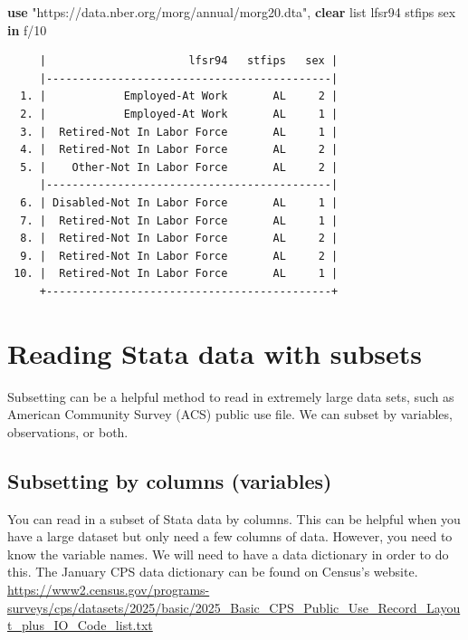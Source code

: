\documentclass[
]{book}
\newenvironment{Shaded}{\begin{snugshade}}{\end{snugshade}}
\newcommand{\KeywordTok}[1]{\textcolor[rgb]{0.13,0.29,0.53}{\textbf{#1}}}
\newcommand{\NormalTok}[1]{#1}
\newcommand{\OtherTok}[1]{\textcolor[rgb]{0.56,0.35,0.01}{#1}}
\newcommand{\StringTok}[1]{\textcolor[rgb]{0.31,0.60,0.02}{#1}}
\begin{document}
\begin{Shaded}
\begin{Highlighting}[]
\KeywordTok{use} \StringTok{"https://data.nber.org/morg/annual/morg20.dta"}\NormalTok{, }\KeywordTok{clear}
\OtherTok{list}\NormalTok{ lfsr94 stfips sex }\KeywordTok{in}\NormalTok{ f/10}
\end{Highlighting}
\end{Shaded}

\begin{verbatim}
     |                      lfsr94   stfips   sex |
     |--------------------------------------------|
  1. |            Employed-At Work       AL     2 |
  2. |            Employed-At Work       AL     1 |
  3. |  Retired-Not In Labor Force       AL     1 |
  4. |  Retired-Not In Labor Force       AL     2 |
  5. |    Other-Not In Labor Force       AL     2 |
     |--------------------------------------------|
  6. | Disabled-Not In Labor Force       AL     1 |
  7. |  Retired-Not In Labor Force       AL     1 |
  8. |  Retired-Not In Labor Force       AL     2 |
  9. |  Retired-Not In Labor Force       AL     2 |
 10. |  Retired-Not In Labor Force       AL     1 |
     +--------------------------------------------+
\end{verbatim}

\section{Reading Stata data with subsets}\label{reading-stata-data-with-subsets}

Subsetting can be a helpful method to read in extremely large data sets, such as American Community Survey (ACS) public use file. We can subset by variables, observations, or both.

\subsection{Subsetting by columns (variables)}\label{subsetting-by-columns-variables}

You can read in a subset of Stata data by columns. This can be helpful when you have a large dataset but only need a few columns of data. However, you need to know the variable names. We will need to have a data dictionary in order to do this. The January CPS data dictionary can be found on Census's website. \url{https://www2.census.gov/programs-surveys/cps/datasets/2025/basic/2025_Basic_CPS_Public_Use_Record_Layout_plus_IO_Code_list.txt}
\end{document}
